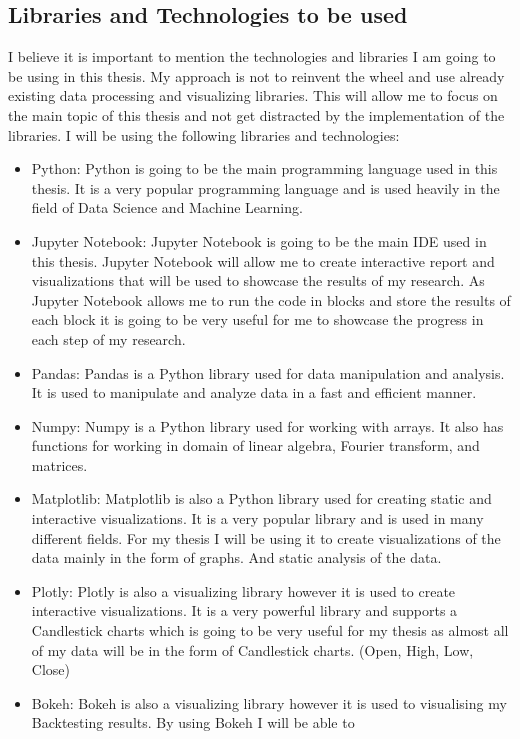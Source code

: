 \documentclass{imc-inf}
\begin{document}
	\subsection{Libraries and Technologies to be used}
	I believe it is important to mention the technologies and libraries I am going to be using in this thesis. My approach is not to reinvent the wheel and 
	use already existing data processing and visualizing libraries. This will allow me to focus on the main topic of this thesis and not get distracted by
	the implementation of the libraries. I will be using the following libraries and technologies:
	\begin{itemize}
		\item Python: Python is going to be the main programming language used in this thesis. It is a very popular programming language and is used 
		heavily in the field of Data Science and Machine Learning.
		\item Jupyter Notebook: Jupyter Notebook is going to be the main IDE used in this thesis. Jupyter Notebook will allow me to create interactive
		report and visualizations that will be used to showcase the results of my research. As Jupyter Notebook allows me to run the code in blocks and store
		the results of each block it is going to be very useful for me to showcase the progress in each step of my research.
		\item Pandas: Pandas is a Python library used for data manipulation and analysis. It is used to manipulate and analyze data in a fast and efficient manner.
		\item Numpy: Numpy is a Python library used for working with arrays. It also has functions for working in domain of linear algebra, Fourier transform, and matrices.
		\item  Matplotlib: Matplotlib is also a Python library used for creating static and interactive visualizations. It is a very popular library and is used in many different fields.
		For my thesis I will be using it to create visualizations of the data mainly in the form of graphs. And static analysis of the data.
		\item Plotly: Plotly is also a visualizing library however it is used to create interactive visualizations. It is a very powerful library and supports a Candlestick
		charts which is going to be very useful for my thesis as almost all of my data will be in the form of Candlestick charts. (Open, High, Low, Close)
		\item Bokeh: Bokeh is also a visualizing library however it is used to visualising my Backtesting results. By using Bokeh I will be able to 

\end{itemize}
\end{document}
